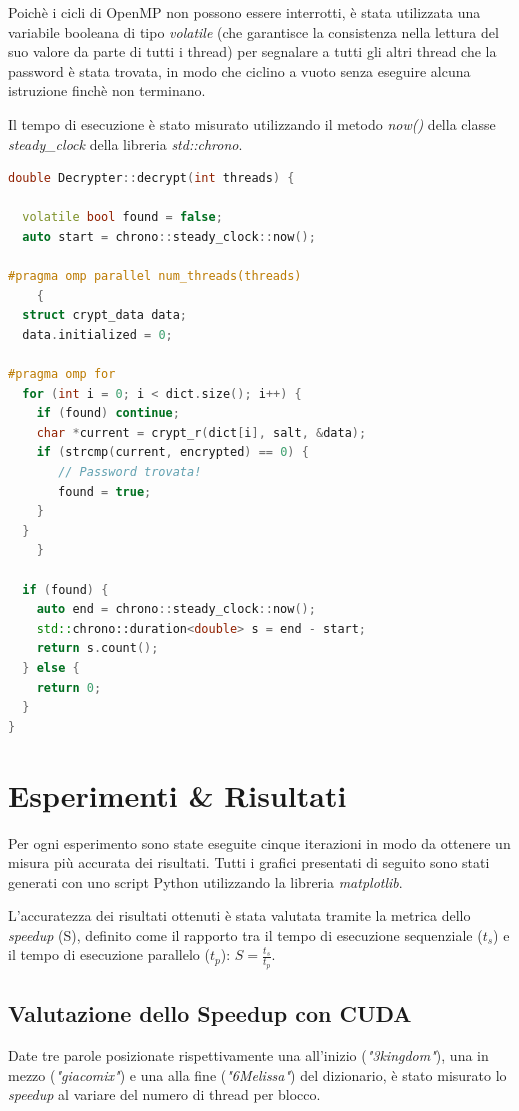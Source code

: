 \documentclass[10pt,twocolumn,letterpaper]{article}
\begin{document}
Poichè i cicli di OpenMP non possono essere interrotti, è stata utilizzata una variabile booleana di tipo \textit{volatile} (che garantisce la consistenza nella lettura del suo valore da parte di tutti i thread) per segnalare a tutti gli altri thread che la password è stata trovata, in modo che ciclino a vuoto senza eseguire alcuna istruzione finchè non terminano.

Il tempo di esecuzione è stato misurato utilizzando il metodo \textit{now()} della classe \textit{steady\_clock} della libreria \textit{std::chrono}.

\begin{lstlisting}[basicstyle=\scriptsize, language=C++, frame=single, caption={Esempio di ricerca in parallelo con OpenMP},captionpos=b]
double Decrypter::decrypt(int threads) {

  volatile bool found = false;
  auto start = chrono::steady_clock::now();

#pragma omp parallel num_threads(threads)
    {
  struct crypt_data data;
  data.initialized = 0;

#pragma omp for
  for (int i = 0; i < dict.size(); i++) {
    if (found) continue;
    char *current = crypt_r(dict[i], salt, &data);
    if (strcmp(current, encrypted) == 0) {
       // Password trovata!
       found = true;
    }
  }
    }

  if (found) {
    auto end = chrono::steady_clock::now();
    std::chrono::duration<double> s = end - start;
    return s.count();
  } else {
    return 0;
  }
}
\end{lstlisting}

\section{Esperimenti \& Risultati}
Per ogni esperimento sono state eseguite cinque iterazioni in modo da ottenere un misura più accurata dei risultati. Tutti i grafici presentati di seguito sono stati generati con uno script Python utilizzando la libreria \textit{matplotlib}.

L'accuratezza dei risultati ottenuti è stata valutata tramite la metrica dello \textit{speedup} (S), definito come il rapporto tra il tempo di esecuzione sequenziale ($t_s$) e il tempo di esecuzione parallelo ($t_p$): $S = \frac{t_s}{t_p}$.

\subsection{Valutazione dello Speedup con CUDA}
Date tre parole posizionate rispettivamente una all'inizio (\textit{"3kingdom"}), una in mezzo (\textit{"giacomix"}) e una alla fine (\textit{"6Melissa"}) del dizionario, è stato misurato lo \textit{speedup} al variare del numero di thread per blocco.
\end{document}
